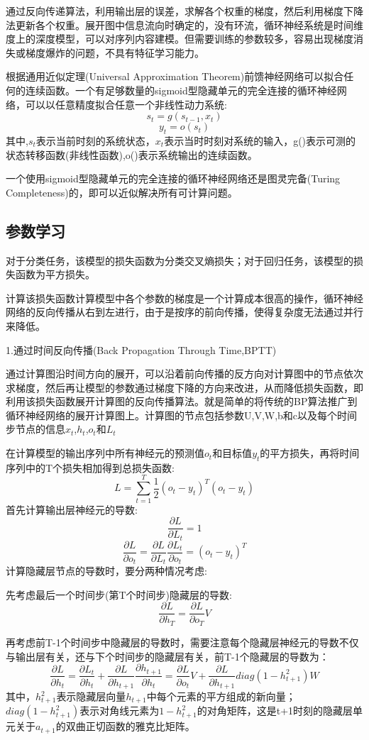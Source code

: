\documentclass[openbib]{article}
\begin{document}
通过反向传递算法，利用输出层的误差，求解各个权重的梯度，然后利用梯度下降法更新各个权重。展开图中信息流向时确定的，没有环流，循环神经系统是时间维度上的深度模型，可以对序列内容建模。但需要训练的参数较多，容易出现梯度消失或梯度爆炸的问题，不具有特征学习能力。

根据通用近似定理(Universal Approximation Theorem)前馈神经网络可以拟合任何的连续函数。一个有足够数量的sigmoid型隐藏单元的完全连接的循环神经网络，可以以任意精度拟合任意一个非线性动力系统:
$$s_t = g(s_{t-1},x_t)$$
$$y_t = o(s_t)$$
其中,$s_t$表示当前时刻的系统状态，$x_t$表示当时时刻对系统的输入，g()表示可测的状态转移函数(非线性函数),o()表示系统输出的连续函数。

一个使用sigmoid型隐藏单元的完全连接的循环神经网络还是图灵完备(Turing Completeness)的，即可以近似解决所有可计算问题。
\subsection{参数学习}
对于分类任务，该模型的损失函数为分类交叉熵损失；对于回归任务，该模型的损失函数为平方损失。

计算该损失函数计算模型中各个参数的梯度是一个计算成本很高的操作，循环神经网络的反向传播从右到左进行，由于是按序的前向传播，使得复杂度无法通过并行来降低。

\begin{center}
	1.通过时间反向传播(Back Propagation Through Time,BPTT)
\end{center}
通过计算图沿时间方向的展开，可以沿着前向传播的反方向对计算图中的节点依次求梯度，然后再让模型的参数通过梯度下降的方向来改进，从而降低损失函数，即利用该损失函数展开计算图的反向传播算法。就是简单的将传统的BP算法推广到循环神经网络的展开计算图上。计算图的节点包括参数U,V,W,b和c以及每个时间步节点的信息$x_t$,$h_t$,$o_t$和$L_t$

在计算模型的输出序列中所有神经元的预测值$o_t$和目标值$y_t$的平方损失，再将时间序列中的T个损失相加得到总损失函数:
$$L=\sum_{t=1}^{T}\frac{1}{2}(o_t-y_t)^T(o_t-y_t)$$
首先计算输出层神经元的导数:
$$\frac{\partial L}{\partial L_t}=1$$
$$\frac{\partial L}{\partial o_t}=\frac{\partial L}{\partial L_t}\frac{\partial L_t}{\partial o_t}=(o_t - y_t)^T$$
计算隐藏层节点的导数时，要分两种情况考虑:

先考虑最后一个时间步(第T个时间步)隐藏层的导数:
$$\frac{\partial L}{\partial h_T}= \frac{\partial L}{\partial o_T}V$$

再考虑前T-1个时间步中隐藏层的导数时，需要注意每个隐藏层神经元的导数不仅与输出层有关，还与下个时间步的隐藏层有关，前T-1个隐藏层的导数为：
$$\frac{\partial L}{\partial h_t}=\frac{\partial L_t}{\partial h_t}+\frac{\partial L}{\partial h_{t+1}}\frac{\partial h_{t+1}}{\partial h_t}= \frac{\partial L}{\partial o_t}V+\frac{\partial L}{\partial h_{t+1}}diag(1-h_{t+1}^2)W$$
其中，$h_{t+1}^2$表示隐藏层向量$h_{t+1}$中每个元素的平方组成的新向量；$diag(1-h_{t+1}^2)$表示对角线元素为$1-h_{t+1}^2$的对角矩阵，这是t+1时刻的隐藏层单元关于$a_{t+1}$的双曲正切函数的雅克比矩阵。
\end{document}
